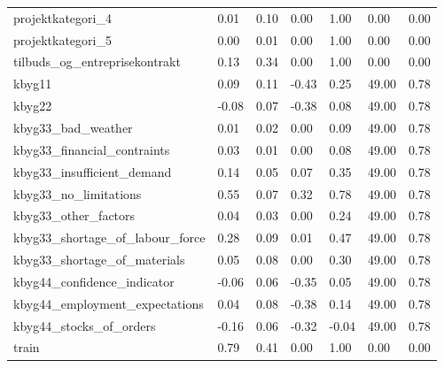 \begin{landscape}
\begin{longtable}[h!]{lllllll}
projektkategori_4 & 0.01 & 0.10 & 0.00 & 1.00 & 0.00 & 0.00 \\
projektkategori_5 & 0.00 & 0.01 & 0.00 & 1.00 & 0.00 & 0.00 \\
tilbuds_og_entreprisekontrakt & 0.13 & 0.34 & 0.00 & 1.00 & 0.00 & 0.00 \\
kbyg11 & 0.09 & 0.11 & -0.43 & 0.25 & 49.00 & 0.78 \\
kbyg22 & -0.08 & 0.07 & -0.38 & 0.08 & 49.00 & 0.78 \\
kbyg33_bad_weather & 0.01 & 0.02 & 0.00 & 0.09 & 49.00 & 0.78 \\
kbyg33_financial_contraints & 0.03 & 0.01 & 0.00 & 0.08 & 49.00 & 0.78 \\
kbyg33_insufficient_demand & 0.14 & 0.05 & 0.07 & 0.35 & 49.00 & 0.78 \\
kbyg33_no_limitations & 0.55 & 0.07 & 0.32 & 0.78 & 49.00 & 0.78 \\
kbyg33_other_factors & 0.04 & 0.03 & 0.00 & 0.24 & 49.00 & 0.78 \\
kbyg33_shortage_of_labour_force & 0.28 & 0.09 & 0.01 & 0.47 & 49.00 & 0.78 \\
kbyg33_shortage_of_materials & 0.05 & 0.08 & 0.00 & 0.30 & 49.00 & 0.78 \\
kbyg44_confidence_indicator & -0.06 & 0.06 & -0.35 & 0.05 & 49.00 & 0.78 \\
kbyg44_employment_expectations & 0.04 & 0.08 & -0.38 & 0.14 & 49.00 & 0.78 \\
kbyg44_stocks_of_orders & -0.16 & 0.06 & -0.32 & -0.04 & 49.00 & 0.78 \\
train & 0.79 & 0.41 & 0.00 & 1.00 & 0.00 & 0.00 \\
\end{longtable}\end{landscape}
